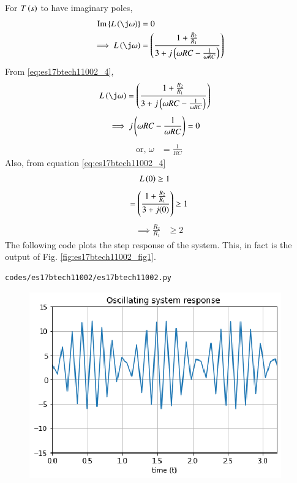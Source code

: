 \begin{enumerate}[label=\arabic*.,ref=\theenumi]
For $T\left(s\right)$ to have imaginary poles, 
\begin{align}
\text{Im}\cbrak{L\brak{\j \omega}} &= 0
\\
\implies L\brak{\j\omega}&= \brak{\frac{1+\frac{R_{2}}{R_{1}}}{3+ j \brak{\omega RC-\frac{1}{\omega RC}}}}
\end{align}
From \eqref{eq:es17btech11002_4},
\begin{align}
 L\brak{\j\omega} &=\brak{\frac{1+\frac{R_{2}}{R_{1}}}{3+j \brak{\omega RC-\frac{1}{\omega RC}}}}
\end{align} 
\begin{align}
\implies j\left(\omega RC - \frac{1}{\omega RC}\right) &= 0
\end{align}
\begin{align}
\text{or, } \omega &= \frac{1}{RC}
\label{eq:es17btech11002_freq}
\end{align}
Also, from equation \eqref{eq:es17btech11002_4}
\begin{align}
L\left(0\right) &\ge 1
\end{align}
\begin{align}
= \left(\frac{1+\frac{R_{2}}{R_{1}}}{3+j(0)}\right) \geq 1
\end{align}
\begin{align}
\implies \frac{R_{2}}{R_{1}} &\geq 2
\end{align}
%
The following code plots the step response of the system.  This, in fact is the output of Fig. \ref{fig:es17btech11002_fig1}.
\begin{lstlisting}
codes/es17btech11002/es17btech11002.py
\end{lstlisting}
\begin{figure}[!ht]
\centering
\includegraphics[width=\columnwidth]{./figs/es17btech11002/es17btech11002.eps}

\end{figure}
\end{enumerate}
